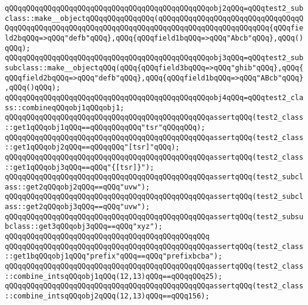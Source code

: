 \verb|qQQqqQQqqQQqqQQqqQQqqQQqqQQqqQQqqQQqqQQqqQQqqQQqobj2qQQq=qQQqtest2_subclass::make__objectqQQqqQQqqQQqqQQq(qQQqqQQqqQQqqQQqqQQqqQQqqQQqqQQqqQQqqQQqqQQqqQQqqQQqqQQqqQQqqQQqqQQqqQQqqQQqqQQqqQQqqQQqqQQqqQQq{qQQqfield2bqQQq=>qQQq"defb"qQQq},qQQq{qQQqfield1bqQQq=>qQQq"Abcb"qQQq},qQQq()qQQq);|\newline
\verb|qQQqqQQqqQQqqQQqqQQqqQQqqQQqqQQqqQQqqQQqqQQqqQQqobj3qQQq=qQQqtest2_subsubclass::make__objectqQQq(qQQq{qQQqfield3bqQQq=>qQQq"ghib"qQQq},qQQq{qQQqfield2bqQQq=>qQQq"defb"qQQq},qQQq{qQQqfield1bqQQq=>qQQq"ABcb"qQQq},qQQq()qQQq);|\newline
\verb|qQQqqQQqqQQqqQQqqQQqqQQqqQQqqQQqqQQqqQQqqQQqqQQqobj4qQQq=qQQqtest2_class::combineqQQqobj1qQQqobj1;|\newline
\newline
\verb|qQQqqQQqqQQqqQQqqQQqqQQqqQQqqQQqqQQqqQQqqQQqqQQqassertqQQq(test2_class::get1qQQqobj1qQQq==qQQqqQQqqQQq"tsr"qQQqqQQq);|\newline
\verb|qQQqqQQqqQQqqQQqqQQqqQQqqQQqqQQqqQQqqQQqqQQqqQQqassertqQQq(test2_class::get1qQQqobj2qQQq==qQQqqQQq"[tsr]"qQQq);|\newline
\verb|qQQqqQQqqQQqqQQqqQQqqQQqqQQqqQQqqQQqqQQqqQQqqQQqassertqQQq(test2_class::get1qQQqobj3qQQq==qQQq"{[tsr]}");|\newline
\newline
\verb|qQQqqQQqqQQqqQQqqQQqqQQqqQQqqQQqqQQqqQQqqQQqqQQqassertqQQq(test2_subclass::get2qQQqobj2qQQq==qQQq"uvw");|\newline
\verb|qQQqqQQqqQQqqQQqqQQqqQQqqQQqqQQqqQQqqQQqqQQqqQQqassertqQQq(test2_subclass::get2qQQqobj3qQQq==qQQq"uvw");|\newline
\newline
\verb|qQQqqQQqqQQqqQQqqQQqqQQqqQQqqQQqqQQqqQQqqQQqqQQqassertqQQq(test2_subsubclass::get3qQQqobj3qQQq==qQQq"xyz");|\newline
\verb|qQQqqQQqqQQqqQQqqQQqqQQqqQQqqQQqqQQqqQQqqQQqqQQq|\newline
\verb|qQQqqQQqqQQqqQQqqQQqqQQqqQQqqQQqqQQqqQQqqQQqqQQqassertqQQq(test2_class::get1bqQQqobj1qQQq"prefix"qQQq==qQQq"prefixbcba");|\newline
\newline
\verb|qQQqqQQqqQQqqQQqqQQqqQQqqQQqqQQqqQQqqQQqqQQqqQQqassertqQQq(test2_class::combine_intsqQQqobj1qQQq(12,13)qQQq==qQQqqQQq25);|\newline
\verb|qQQqqQQqqQQqqQQqqQQqqQQqqQQqqQQqqQQqqQQqqQQqqQQqassertqQQq(test2_class::combine_intsqQQqobj2qQQq(12,13)qQQq==qQQq156);|\newline
\newline
